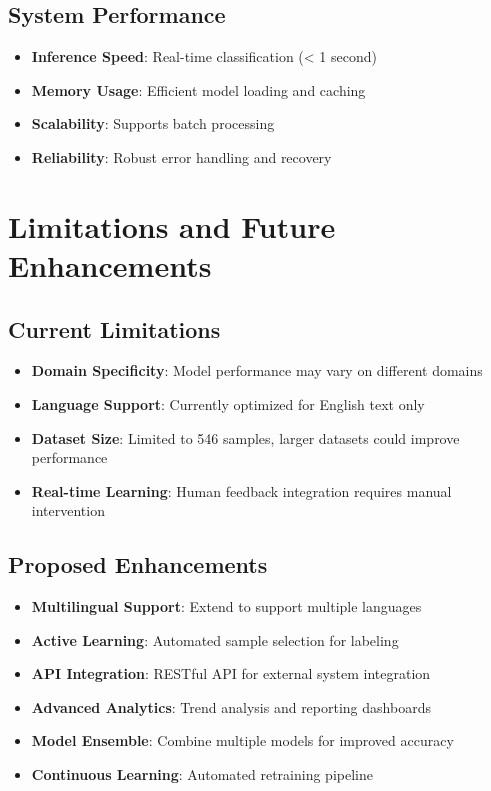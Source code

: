 \documentclass[11pt,a4paper]{article}
\begin{document}
\subsection{System Performance}
\begin{itemize}
  \item \textbf{Inference Speed}: Real-time classification (< 1 second)
  \item \textbf{Memory Usage}: Efficient model loading and caching
  \item \textbf{Scalability}: Supports batch processing
  \item \textbf{Reliability}: Robust error handling and recovery
\end{itemize}

\section{Limitations and Future Enhancements}

\subsection{Current Limitations}
\begin{itemize}
  \item \textbf{Domain Specificity}: Model performance may vary on different domains
  \item \textbf{Language Support}: Currently optimized for English text only
  \item \textbf{Dataset Size}: Limited to 546 samples, larger datasets could improve performance
  \item \textbf{Real-time Learning}: Human feedback integration requires manual intervention
\end{itemize}

\subsection{Proposed Enhancements}
\begin{itemize}
  \item \textbf{Multilingual Support}: Extend to support multiple languages
  \item \textbf{Active Learning}: Automated sample selection for labeling
  \item \textbf{API Integration}: RESTful API for external system integration
  \item \textbf{Advanced Analytics}: Trend analysis and reporting dashboards
  \item \textbf{Model Ensemble}: Combine multiple models for improved accuracy
  \item \textbf{Continuous Learning}: Automated retraining pipeline
\end{itemize}
\end{document}
